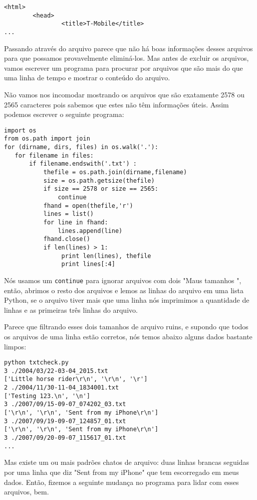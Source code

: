 \begin{verbatim}
<html>
        <head>
                <title>T-Mobile</title>
...
\end{verbatim}

%
Passando através do arquivo parece que não há boas informações desses arquivos para que possamos provavelmente eliminá-los. Mas antes de excluir os arquivos, vamos escrever um programa para procurar por arquivos que são mais do que uma linha de tempo e mostrar o conteúdo do arquivo. 

Não vamos nos incomodar mostrando os arquivos que são exatamente 2578 ou 2565 caracteres pois sabemos que estes não têm informações úteis. Assim podemos escrever o seguinte programa:

\begin{verbatim}
import os
from os.path import join
for (dirname, dirs, files) in os.walk('.'):
   for filename in files:
       if filename.endswith('.txt') :
           thefile = os.path.join(dirname,filename)
           size = os.path.getsize(thefile)
           if size == 2578 or size == 2565:
               continue
           fhand = open(thefile,'r')
           lines = list()
           for line in fhand:
               lines.append(line)
           fhand.close()
           if len(lines) > 1:
                print len(lines), thefile
                print lines[:4]
\end{verbatim}

%
Nós usamos um {\tt continue} para ignorar arquivos com dois "Maus tamanhos ", então, abrimos o resto dos arquivos e lemos as linhas do arquivo em uma lista Python, se o arquivo tiver mais que uma linha nós imprimimos a quantidade de linhas e as primeiras três linhas do arquivo.

Parece que filtrando esses dois tamanhos de arquivo ruins, e supondo
que todos os arquivos de uma linha estão corretos, nós temos abaixo alguns dados bastante limpos:

\begin{verbatim}
python txtcheck.py 
3 ./2004/03/22-03-04_2015.txt
['Little horse rider\r\n', '\r\n', '\r']
2 ./2004/11/30-11-04_1834001.txt
['Testing 123.\n', '\n']
3 ./2007/09/15-09-07_074202_03.txt
['\r\n', '\r\n', 'Sent from my iPhone\r\n']
3 ./2007/09/19-09-07_124857_01.txt
['\r\n', '\r\n', 'Sent from my iPhone\r\n']
3 ./2007/09/20-09-07_115617_01.txt
...
\end{verbatim}
%

Mas existe um ou mais padrões chatos de arquivo:
duas linhas brancas seguidas por uma linha que diz "Sent from my iPhone" que tem escorregado em meus dados.
Então, fizemos a seguinte mudança no programa para lidar com esses arquivos, bem.

